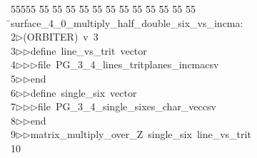 %
%
\begin{tabbing}
55555 \= 55 \= 55 \= 55 \= 55 \= 55 \= 55 \= 55 \= 55 \= 55 \= 55 \= 55 \= 55 \= \>surface\_4\_0\_multiply\_half\_double\_six\_vs\_incma:\\[0pt]
2\>$\triangleright$\>(ORBITER)\ v\ 3\ \\[0pt]
3\>$\triangleright$\>$\triangleright$\>define\ line\_vs\_trit\ vector\ \\[0pt]
4\>$\triangleright$\>$\triangleright$\>$\triangleright$\>file\ PG\_3\_4\_lines\_tritplanes\_incmacsv\ \\[0pt]
5\>$\triangleright$\>$\triangleright$\>end\ \\[0pt]
6\>$\triangleright$\>$\triangleright$\>define\ single\_six\ vector\ \\[0pt]
7\>$\triangleright$\>$\triangleright$\>$\triangleright$\>file\ PG\_3\_4\_single\_sixes\_char\_veccsv\ \\[0pt]
8\>$\triangleright$\>$\triangleright$\>end\ \\[0pt]
9\>$\triangleright$\>$\triangleright$\>matrix\_multiply\_over\_Z\ single\_six\ line\_vs\_trit\\[0pt]
10\>\end{tabbing}
